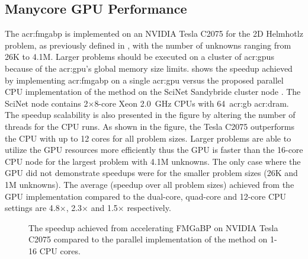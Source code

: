 \subsection{Manycore GPU Performance}

The \gls{acr:fmgabp} is implemented on an {NVIDIA} Tesla {C2075} for the 2D Helmhotlz problem, as previously defined in , with the number of unknowns ranging from 26K to 4.1M.
Larger problems should be executed on a cluster of \glspl{acr:gpu} because of the \gls{acr:gpu}'s global memory size limits. 
 shows the speedup achieved by implementing \gls{acr:fmgabp} on a single \gls{acr:gpu} versus the proposed parallel CPU implementation of the method on the SciNet Sandybride cluster node \cite{bib:scinet}.
The SciNet node contains 2$\times$8-core Xeon 2.0~GHz CPUs with 64~\gls{acr:gb} \gls{acr:dram}.
The speedup scalability is also presented in the figure by altering the number of threads for the CPU runs. 
As shown in the figure, the Tesla C2075 outperforms the CPU with up to 12 cores for all problem sizes. 
Larger problems are able to utilize the GPU resources more efficiently thus the GPU is faster than the 16-core CPU node for the largest problem with 4.1M unknowns.
The only case where the GPU did not demonstrate speedups were for the smaller problem sizes (26K and 1M unknowns). 
The average (speedup over all problem sizes) achieved from the GPU implementation compared to the dual-core, quad-core and 12-core CPU settings are 4.8$\times$, 2.3$\times$ and 1.5$\times$ respectively.

\begin{figure}[t]
	\caption[The FMGaBP GPU implementation speedups.]{The speedup achieved from accelerating FMGaBP on NVIDIA Tesla C2075 compared to the parallel implementation of the method on 1-16 CPU cores.}
	\label{fig:gpuRes}
\end{figure}

